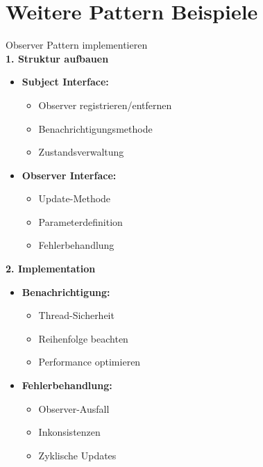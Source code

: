 \section{Weitere Pattern Beispiele}

\begin{KR}{Observer Pattern implementieren}\\
\textbf{1. Struktur aufbauen}
\begin{itemize}
    \item \textbf{Subject Interface:}
    \begin{itemize}
        \item Observer registrieren/entfernen
        \item Benachrichtigungsmethode
        \item Zustandsverwaltung
    \end{itemize}
    
    \item \textbf{Observer Interface:}
    \begin{itemize}
        \item Update-Methode
        \item Parameterdefinition
        \item Fehlerbehandlung
    \end{itemize}
\end{itemize}

\textbf{2. Implementation}
\begin{itemize}
    \item \textbf{Benachrichtigung:}
    \begin{itemize}
        \item Thread-Sicherheit
        \item Reihenfolge beachten
        \item Performance optimieren
    \end{itemize}
    
    \item \textbf{Fehlerbehandlung:}
    \begin{itemize}
        \item Observer-Ausfall
        \item Inkonsistenzen
        \item Zyklische Updates
    \end{itemize}
\end{itemize}
\end{KR}

